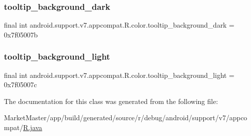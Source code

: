 \subsubsection{\texorpdfstring{tooltip\+\_\+background\+\_\+dark}{tooltip\_background\_dark}}
{\footnotesize\ttfamily final int android.\+support.\+v7.\+appcompat.\+R.\+color.\+tooltip\+\_\+background\+\_\+dark = 0x7f05007b\hspace{0.3cm}{\ttfamily [static]}}

\mbox{\label{classandroid_1_1support_1_1v7_1_1appcompat_1_1R_1_1color_aaebcd03ad73492f72e31f7ae1a5e949f}} 
\subsubsection{\texorpdfstring{tooltip\+\_\+background\+\_\+light}{tooltip\_background\_light}}
{\footnotesize\ttfamily final int android.\+support.\+v7.\+appcompat.\+R.\+color.\+tooltip\+\_\+background\+\_\+light = 0x7f05007c\hspace{0.3cm}{\ttfamily [static]}}



The documentation for this class was generated from the following file\+:\begin{DoxyCompactItemize}
\item 
Market\+Master/app/build/generated/source/r/debug/android/support/v7/appcompat/\mbox{\hyperlink{debug_2android_2support_2v7_2appcompat_2R_8java}{R.\+java}}\end{DoxyCompactItemize}
